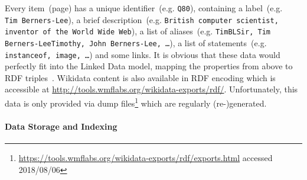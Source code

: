Every item~(page) has a unique identifier~(e.g. \texttt{Q80}), containing a label~(e.g. \texttt{Tim~Berners-Lee}), a brief description~(e.g. \texttt{British computer scientist, inventor of the World Wide Web}), a list of aliases~(e.g. \texttt{TimBLSir, Tim Berners-LeeTimothy, John Berners-Lee, \ldots}), a list of statements~(e.g. \texttt{instanceof, image, \ldots}) and some links. 
It is obvious that these data would perfectly fit into the Linked Data model, mapping the properties from above to RDF triples~\cite{erxleben2014}.
Wikidata content is also available in RDF encoding which is accessible at \url{http://tools.wmflabs.org/wikidata-exports/rdf/}. Unfortunately, this data is only provided via dump files\footnote{\url{https://tools.wmflabs.org/wikidata-exports/rdf/exports.html} accessed 2018/08/06} which are regularly (re-)generated. 

\paragraph{Data Storage and Indexing}

